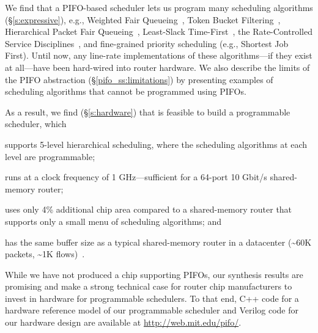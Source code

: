 We find that a PIFO-based scheduler lets us program many scheduling
algorithms (\S\ref{s:expressive}), e.g., Weighted Fair
Queueing~\cite{wfq}, Token Bucket Filtering~\cite{tbf}, Hierarchical
Packet Fair Queueing~\cite{hpfq}, Least-Slack Time-First~\cite{lstf}, the Rate-Controlled
Service Disciplines~\cite{rcsd}, and fine-grained priority scheduling
(e.g., Shortest Job First). Until now, any line-rate implementations
of these algorithms---if they exist at all---have been hard-wired into
router hardware. We also describe the limits of the PIFO abstraction
(\S\ref{pifo_ss:limitations}) by presenting examples of scheduling
algorithms that cannot be programmed using PIFOs.


As a result, we find (\S\ref{s:hardware}) that is feasible to build a programmable scheduler, which
\begin{CompactItemize}
  \item supports 5-level hierarchical scheduling, where the scheduling
    algorithms at each level are programmable;
  \item runs at a clock frequency of 1 GHz---sufficient for a 64-port
    10 Gbit/s shared-memory router;
  \item uses only 4\% additional chip area compared to a
    shared-memory router that supports only a small menu of scheduling
    algorithms; and
  \item has the same buffer size as a typical shared-memory router
    in a datacenter (\textasciitilde 60K packets, \textasciitilde 1K flows)~\cite{trident2}.
\end{CompactItemize}

While we have not produced a chip supporting PIFOs, our synthesis results
are promising and make a strong technical case for router chip manufacturers to invest
in hardware for programmable schedulers. To that end, C++ code for a
hardware reference model of our programmable scheduler and Verilog
code for our hardware design are available at \url{http://web.mit.edu/pifo/}.
